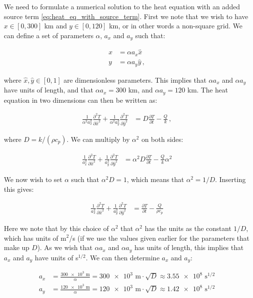 \documentclass[reprint,english,notitlepage]{revtex4-1}  %
\begin{document}
We need to formulate a numerical solution to the heat equation with an added source term \eqref{eq:heat_eq_with_source_term}. First we note that we wish to have $x \in [0,300]$ km and $y \in [0,120]$ km, or in other words a non-square grid. We can define a set of parameters $\alpha$, $a_x$ and $a_y$ such that:

\begin{align*}
x &= \alpha a_x \hat{x} \\
y &= \alpha a_y \hat{y} \, ,
\end{align*}

where $\hat{x},\hat{y} \in [0,1]$ are dimensionless parameters. This implies that $\alpha a_x$ and $\alpha a_y$ have units of length, and that $\alpha a_x = 300$ km, and $\alpha a_y = 120$ km. The heat equation in two dimensions can then be written as:

\begin{align*}
\frac{1}{\alpha^2 a_x^2}\frac{\partial^2 T}{\partial \hat{x}^2} + \frac{1}{\alpha^2 a_y^2} \frac{\partial^2 T}{\partial \hat{y}^2} &= D\frac{\partial T}{\partial t} - \frac{Q}{k} \, ,
\end{align*} 

where $D = k/(\rho c_p)$. We can multiply by $\alpha^2$ on both sides:

\begin{align*}
\frac{1}{a_x^2}\frac{\partial^2 T}{\partial \hat{x}^2} + \frac{1}{a_y^2} \frac{\partial^2 T}{\partial \hat{y}^2} &= \alpha^2 D \frac{\partial T}{\partial t} - \frac{Q}{k}\alpha^2 
\end{align*}

We now wish to set $\alpha$ such that $\alpha^2 D = 1$, which means that $\alpha^2 = 1/D$. Inserting this gives:

\begin{align*}
\frac{1}{a_x^2} \frac{\partial^2 T}{\partial \hat{x}^2} + \frac{1}{a_y^2} \frac{\partial^2 T}{\partial \hat{y}^2} &=  \frac{\partial T}{\partial t} - \frac{Q}{\rho c_p}
\end{align*}

Here we note that by this choice of $\alpha^2 $ that $\alpha^2$ has the units as the constant $1/D$, which has units of m$^2$/s (if we use the values given earlier for the parameters that make up $D$). As we wish that $\alpha a_x$ and $\alpha a_y$ has units of length, this implies that $a_x$ and $a_y$ have units of s$^{1/2}$. We can then determine $a_x$ and $a_y$:

\begin{align*}
a_x &= \frac{\num{300e3} \text{ m}}{\alpha} = \num{300e3}\text{ m} \cdot \sqrt{D} \approx \num{3.55e8} \text{ s}^{1/2} \\
a_y &= \frac{\num{120e3} \text{ m}}{\alpha} = \num{120e3}\text{ m} \cdot \sqrt{D} \approx \num{1.42e8} \text{ s}^{1/2}
\end{align*}
\end{document}
